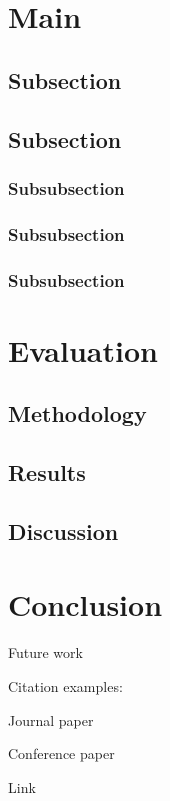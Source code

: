 \documentclass[conference]{IEEEtran}
\begin{document}
\section{Main}

\subsection{Subsection}



\subsection{Subsection}


\subsubsection{Subsubsection}


\subsubsection{Subsubsection}


\subsubsection{Subsubsection}



\section{Evaluation}
\subsection{Methodology}


\subsection{Results}

\subsection{Discussion}



\section{Conclusion}
Future work

Citation examples:

Journal paper \cite{Koeplinger2018}

Conference paper \cite{Siefke2022}

Link \cite{Gapuino}




\end{document}
